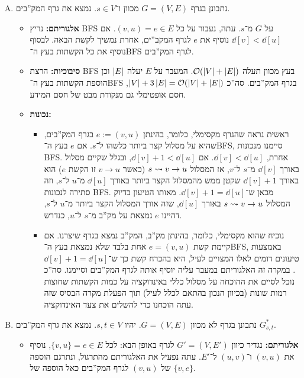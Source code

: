 \documentclass[]{../../../../tex/classes/homework}
\begin{document}
	\begin{enumerate}[A.]
		\item נתבונן בגרף $G = (V, E)$ מכוון ו־$s \in V$. נמצא את גרף המק''בים. 
		
		\begin{itemize}
			\item \textbf{אלגוריתם: }נריץ BFS על $G$ מ־$s$. עתה, נעבור על כל $(v, u) = e \in E$. אם $\dd[v] < \dd[u]$ נוסיף את $e$ לגרף המקב''ים, אחרת נמשיך לקשת הבאה. לבסוף נוסיף את כל הקשתות בעץ ה־BFS לגרף המק''בים. 
			\item \textbf{סיבוכיות: }הרצת BFS בעץ מכוון תעלה $\mathcal{O}(\left \lvert V \right \rvert + \left \lvert E \right \rvert)$. המעבר על $E$ יעלה $\left \lvert E \right \rvert$ וכן הוספת הקשתות בעץ ה־BFS בגרף המק''בים. סה''כ $\left \lvert V \right \rvert + 3\left \lvert E \right \rvert = \mathcal{O}(\left \lvert V \right \rvert + \left \lvert E \right \rvert)$, חסם אופטימלי גם מנקודת מבט של חסם המידע. 
			\item \textbf{נכונות: }
			\begin{itemize}
				\item ראשית נראה שהגרף מקסימלי, כלומר, בהינתן $e := (v, u)$ בגרף המק''בים, שהיא על מסלול קצר ביותר כלשהו ל־$s$. אם $e$ בעץ ה־BFS, סיימנו מנכונות BFS. אחרת, $\dd[v] < \dd[u]$. אם $\dd[v] + 1 < \dd[u]$, ובגלל שקיים מסלול באורך $\dd[v]$ מ־$s$ ל־$v$, אז המסלול $s \rightsquigarrow v \to u$ (כאשר $v \to u$ זו הקשת $e$) הוא באורך $\dd[v] + 1$ שקטן ממש מהמסלול הקצר ביותר באורך $\dd[u]$ מ־$u$ ל־$s$, וזה סתירה לנכונות BFS. מכאן ש־$\dd[v] + 1 = \dd[u]$. מאותו הטיעון בדיוק המסלול $s \rightsquigarrow v \to u$ באורך $\dd[u]$, שזה אורך המסלול הקצר ביותר מ־$u$ ל־$s$, דהיינו $e$ נמצאת על מק''ב מ־$s$ ל־$u$, כנדרש. 
				\item נוכיח שהוא מקסימלי, כלומר, בהינתן מק''ב, המק''ב נמצא בגרף שיצרנו. אם קיימת קשת $e = (v, u)$ אחת בלבד שלא נמצאת בעץ ה־BFS, באמצעות טיעונים דומים לאלו המצויים לעיל, היא בהכרח קשת כך ש־$\dd[v] + 1 = \dd[u]$. במקרה זה האלגוריתם במעבר עליה יוסיף אותה לגרף המק''בים וסיימנו. סה''כ נוכל לסיים את ההוכחה על מסלול כללי באינדוקציה על כמות הקשתות שחוצות רמות שונות (בכיוון הנכון בהתאם לכלל לעיל) תוך הפעלת מקרה הבסיס שזה עתה הוכחנו כדי להשלים את צעד האינדוקציה. 
			\end{itemize}
		\end{itemize}
		
		\item נתבונן בגרף לא מכוון $G = (V, E)$. יהיו $s, t \in V$. נמצא את גרף המק''בים $G^*_{s, t}$. 
		
		\begin{itemize}
			\item \textbf{אלגוריתם: }נגדיר כיוון $G' = (V, E')$ לגרף באופן הבא: לכל $\{v, u\} = e \in E$, נוסיף את $(v, u)$ ו־$(u, v)$ ל־$E'$. עתה נפעיל את האלגוריתם מהתרגול, ונתרגם הוספה של $(v, u)$ לגרף המק''בים כאל הוספה של $\{v, e\}$. 
			

\end{itemize}
\end{enumerate}
\end{document}
